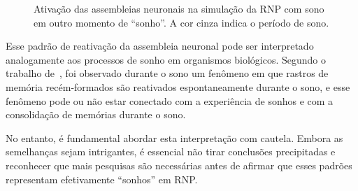 \begin{figure}[!ht]
\caption{Ativação das assembleias neuronais na simulação da RNP com sono em outro momento de ``sonho''. A cor cinza indica o período de sono.}
\end{figure}

Esse padrão de reativação da assembleia neuronal pode ser interpretado analogamente aos processos de sonho em organismos
biológicos. Segundo o trabalho de~, foi observado durante o sono um fenômeno em que rastros
de memória recém-formados são reativados espontaneamente durante o sono, e esse fenômeno pode ou não estar conectado com a experiência de
sonhos e com a consolidação de memórias durante o sono.

No entanto, é fundamental abordar esta interpretação com cautela. Embora as semelhanças sejam intrigantes, é essencial
não tirar conclusões precipitadas e reconhecer que mais pesquisas são necessárias antes de afirmar que esses padrões representam
efetivamente ``sonhos'' em RNP.\@
